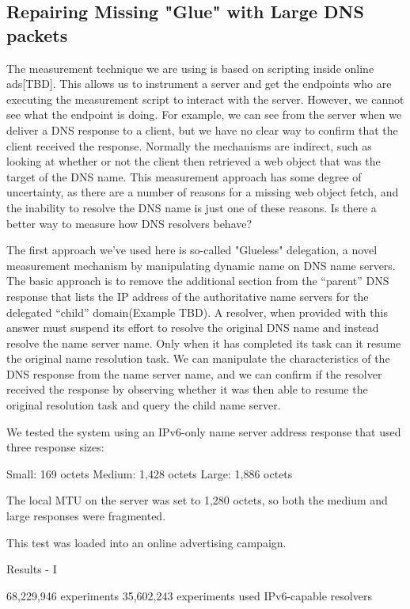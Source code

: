 \subsection{Repairing Missing "Glue" with Large DNS packets}

The measurement technique we are using is based on scripting inside online ads[TBD]. This allows us to instrument a server and get the endpoints who are executing the measurement script to interact with the server. However, we cannot see what the endpoint is doing. For example, we can see from the server when we deliver a DNS response to a client, but we have no clear way to confirm that the client received the response. Normally the mechanisms are indirect, such as looking at whether or not the client then retrieved a web object that was the target of the DNS name. This measurement approach has some degree of uncertainty, as there are a number of reasons for a missing web object fetch, and the inability to resolve the DNS name is just one of these reasons. Is there a better way to measure how DNS resolvers behave?

The first approach we’ve used here is so-called "Glueless" delegation, a novel measurement mechanism by manipulating dynamic name on DNS name servers. The basic approach is to remove the additional section from the “parent” DNS response that lists the IP address of the authoritative name servers for the delegated “child” domain(Example TBD). A resolver, when provided with this answer must suspend its effort to resolve the original DNS name and instead resolve the name server name. Only when it has completed its task can it resume the original name resolution task. We can manipulate the characteristics of the DNS response from the name server name, and we can confirm if the resolver received the response by observing whether it was then able to resume the original resolution task and query the child name server.

We tested the system using an IPv6-only name server address response that used three response sizes:

Small: 169 octets
Medium: 1,428 octets
Large: 1,886 octets

The local MTU on the server was set to 1,280 octets, so both the medium and large responses were fragmented.

This test was loaded into an online advertising campaign.

Results - I 

68,229,946 experiments 
35,602,243 experiments used IPv6-capable resolvers 



